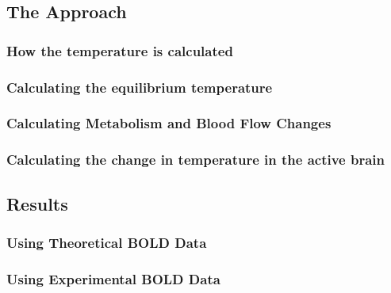   \subsection{The Approach}
    \subsubsection{How the temperature is calculated}
    \subsubsection{Calculating the equilibrium temperature}
    \subsubsection{Calculating Metabolism and Blood Flow Changes}
    \subsubsection{Calculating the change in temperature in the active brain}
  \subsection{Results}
    \subsubsection{Using Theoretical BOLD Data}
    \subsubsection{Using Experimental BOLD Data}
